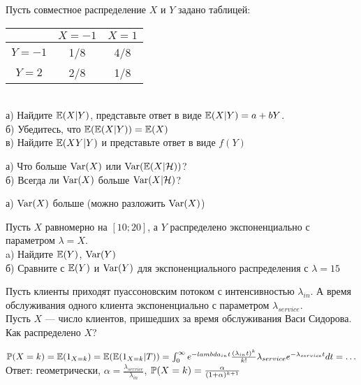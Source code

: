 \begin{problem}
 Пусть совместное распределение $X$ и $Y$ задано таблицей: \\
\begin{tabular}{|c|c|c|}
  \hline
   & $X=-1$ & $X=1$ \\
  \hline
  $Y=-1$ & 1/8 & 4/8 \\
  $Y=2$ & 2/8 & 1/8 \\
  \hline
\end{tabular} \\
а) Найдите $\E(X|Y)$, представьте ответ в виде $\E(X|Y)=a+bY$. \\
б) Убедитесь, что $\E(\E(X|Y))=\E(X)$ \\
в) Найдите $\E(XY|Y)$ и представьте ответ в виде $f(Y)$

\begin{sol}

\end{sol}
\end{problem}

\begin{problem}
а) Что больше $\Var(X)$ или $\Var(\E(X|\mathcal{H}))$? \\
б) Всегда ли $\Var(X)$ больше $\Var(X|\mathcal{H})$?

\begin{sol}

 а) $\Var(X)$ больше (можно разложить $\Var(X)$)
\end{sol}
\end{problem}

\begin{problem}
Пусть $X$ равномерно на $[10;20]$, а $Y$ распределено экспоненциально с параметром $\lambda=X$. \\
a) Найдите $\E(Y)$, $\Var(Y)$ \\
б) Сравните с $\E(Y)$ и $\Var(Y)$ для экспоненциального распределения с $\lambda=15$

\begin{sol}

\end{sol}
\end{problem}

\begin{problem}
Пусть клиенты приходят пуассоновским потоком с интенсивностью $\lambda_{in}$. А время обслуживания одного клиента экспоненциально с параметром $\lambda_{service}$. \\
Пусть $X$ — число клиентов, пришедших за время обслуживания Васи Сидорова. \\
Как распределено $X$?

\begin{sol}

$\P(X=k)=\E(1_{X=k})=\E(\E(1_{X=k}|T))=\int_{0}^{\infty}e^{-lambda_{in}t}\frac{(\lambda_{in}t)^{k}}{k!}\lambda_{service}e^{-\lambda_{service}t}dt=\ldots$ \\
Ответ: геометрически, $\alpha=\frac{\lambda_{service}}{\lambda_{in}}$, $\P(X=k)=\frac{\alpha}{(1+\alpha)^{k+1}}$
\end{sol}
\end{problem}

